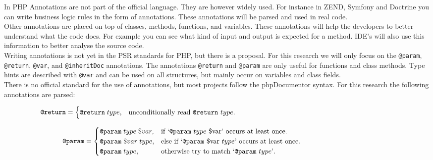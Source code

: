 \documentclass[../main.tex]{subfiles}
\begin{document}
  In PHP Annotations are not part of the official language.
    They are however widely used. 
    For instance in ZEND, Symfony and Doctrine you can write business logic rules in the form of annotations.
    These annotations will be parsed and used in real code.
    \\
    Other annotations are placed on top of classes, methods, functions, and variables.
    These annotations will help the developers to better understand what the code does. 
    For example you can see what kind of input and output is expected for a method.
    IDE's will also use this information to better analyse the source code.
    \\
    Writing annotations is not yet in the PSR standards for PHP, but there is a proposal\footnotemark.
    For this research we will only focus on the \texttt{@param}, \texttt{@return}, \texttt{@var}, and \texttt{@inheritDoc} annotations.
    The annotations \texttt{@return} and \texttt{@param} are only useful for functions and class methods. Type hints are described with \texttt{@var} and can be used on all structures, but mainly occur on variables and class fields.
    \\
    There is no official standard for the use of annotations, but most projects follow the phpDocumentor syntax.
    For this research the following annotations are parsed:
    
\begin{equation}
  \begin{aligned}
  \texttt{@return}=\begin{cases}
    \texttt{@return} \; type, & \text{unconditionally read \texttt{@return} $type$}.\\
  \end{cases}
  \end{aligned}
  \phantom{\hspace{8cm}} %
\end{equation}

\begin{equation}
  \begin{aligned}
  \texttt{@param}=\begin{cases}
    \texttt{@param} \; type \; \$var, & \text{if `\texttt{@param} $type$ \$var' occurs at least once}.\\
    \texttt{@param} \; \$var \; type, & \text{else if `\texttt{@param} \$var $type$' occurs at least once}.\\
    \texttt{@param} \; type, & \text{otherwise try to match `\texttt{@param} $type$'}.\\
  \end{cases}
  \end{aligned}
  \phantom{\hspace{3.55cm}} %
\end{equation}
\end{document}
